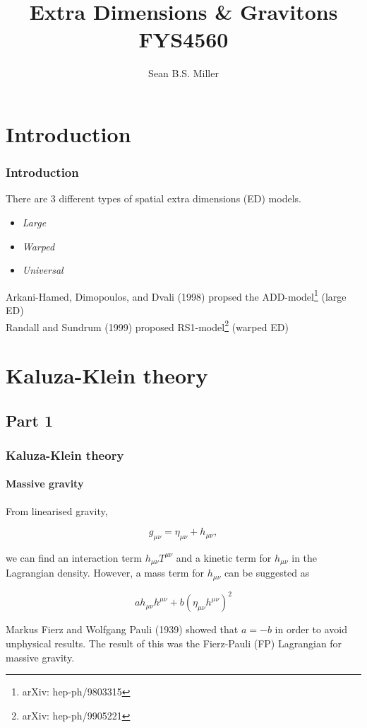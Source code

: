 \documentclass[10pt]{beamer}
\begin{document}
	\title{Extra Dimensions \& Gravitons \\ FYS4560}
	\author{\selectfont Sean B.S. Miller}
	\maketitle
	
	\section{Introduction}
	\begin{frame}
		\frametitle{Introduction}
		There are 3 different types of spatial extra dimensions (ED) models.
		\begin{itemize}
			\item \emph{Large}
			\item \emph{Warped}
			\item \emph{Universal}
		\end{itemize}
		
		Arkani-Hamed, Dimopoulos, and Dvali (1998) propsed the ADD-model\footnote{arXiv: hep-ph/9803315} (large ED)\\
		Randall and Sundrum (1999) proposed RS1-model\footnote{arXiv: hep-ph/9905221} (warped ED)\\
	\end{frame}
	
	\section{Kaluza-Klein theory}
	\subsection{Part 1}
	\begin{frame}
		\frametitle{Kaluza-Klein theory}
		\framesubtitle{Massive gravity}
		From linearised gravity,
		
		\begin{equation}
			g_{\mu\nu} = \eta_{\mu\nu} + h_{\mu\nu},
		\end{equation}
		
		we can find an interaction term $h_{\mu\nu}T^{\mu\nu}$ and a kinetic term for $h_{\mu\nu}$ in the Lagrangian density. However, a mass term for $h_{\mu\nu}$ can be suggested as
		
		\begin{equation}
			ah_{\mu\nu}h^{\mu\nu} + b(\eta_{\mu\nu}h^{\mu\nu})^2
		\end{equation}
		
		Markus Fierz and Wolfgang Pauli (1939) showed\cite{FP} that $a=-b$ in order to avoid unphysical results. The result of this was the Fierz-Pauli (FP) Lagrangian for massive gravity.
		
	\end{frame}
	
\end{document}
